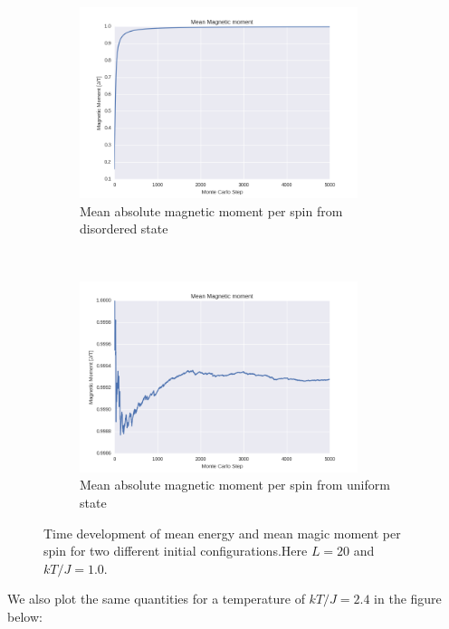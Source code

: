 \documentclass[a4paper, 10pt]{article}
\begin{document}
\begin{figure}[!ht]
     \begin{subfigure}[H!]{0.5\textwidth}
        \centering
        \includegraphics[height=2.2in]{meanMagMomWRandomStart.png}
        \caption{Mean absolute magnetic moment per spin from disordered state}
    \end{subfigure}%
    ~ 
    \begin{subfigure}[H!]{0.5\textwidth}
        \centering
        \includegraphics[height=2.2in]{meanMagMomWUpStart.png}
        \caption{Mean absolute magnetic moment per spin from uniform state}
    \end{subfigure}
      \caption{Time development of mean energy and mean magic moment per spin for two different initial configurations.Here $L=20$ and $kT/J=1.0$.}\label{fig:20x20_Sweep_T_1}
\end{figure}
\linebreak
We also plot the same quantities for a temperature of $kT/J=2.4$ in the figure below:
\newpage
\clearpage
\end{document}
